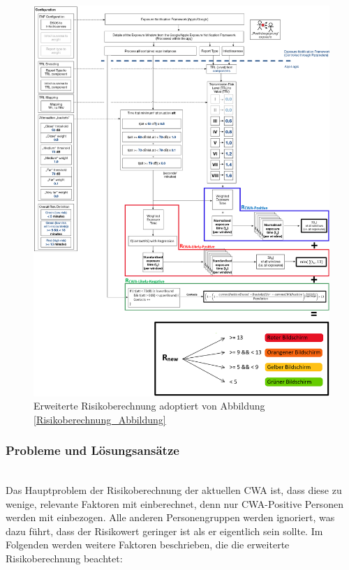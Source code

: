\documentclass[conference,compsoc]{IEEEtran}
\begin{document}
\begin{figure}[htbp]
	\centering
	\includegraphics[width=1.0\textwidth]{"RiskCalculation"}
	\caption{Erweiterte Risikoberechnung adoptiert von Abbildung \ref{Risikoberechnung_Abbildung}}
	\label{ErweiterteRisikoberechnung_Abbildung}
\end{figure}

\subsubsection{Probleme und Lösungsansätze}\label{Probleme_und_Loesungsansaetze_Risikoberechnung}
\text{}\\


Das Hauptproblem der Risikoberechnung der aktuellen CWA ist, dass diese zu wenige, relevante Faktoren mit einberechnet, denn nur CWA-Positive Personen werden mit einbezogen.
Alle anderen Personengruppen werden ignoriert, was dazu führt, dass  der Risikowert geringer ist als er eigentlich sein sollte. 
Im Folgenden werden weitere Faktoren beschrieben, die die erweiterte Risikoberechnung beachtet:
\end{document}

